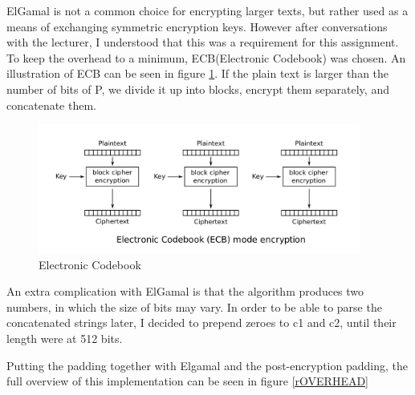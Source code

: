 \documentclass{article}
\begin{document}
ElGamal is not a common choice for encrypting larger texts, but rather used as a means of exchanging symmetric encryption keys. However after conversations with the lecturer, I understood that this was a requirement for this assignment. To keep the overhead to a minimum, ECB(Electronic Codebook) was chosen. An illustration of ECB can be seen in figure \ref{rECB}. If the plain text is larger than the number of bits of P, we divide it up into blocks, encrypt them separately, and concatenate them.
\begin{figure}[H]
 \centering
  \includegraphics[width=300pt]{img/ECB.png}
 \caption{Electronic Codebook\cite{ECB}}
 \label{rECB}
 \end{figure}

An extra complication with ElGamal is that the algorithm produces two numbers, in which the size of bits may vary. In order to be able to parse the concatenated strings later, I decided to prepend zeroes to c1 and c2, until their length were at 512 bits.

Putting the padding together with Elgamal and the post-encryption padding, the full overview of this implementation can be seen in figure \ref{rOVERHEAD}
\end{document}
